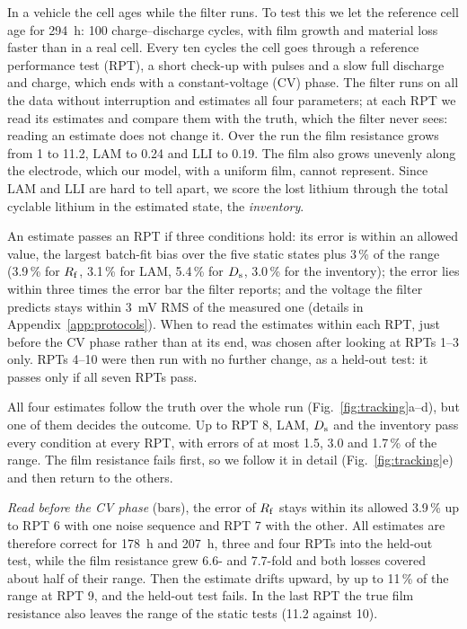 \documentclass[journal]{IEEEtran}
\newcommand{\LAM}{\mathrm{LAM}}\newcommand{\LLI}{\mathrm{LLI}}\newcommand{\phipl}{\phi_{\mathrm{pl}}}
\begin{document}
In a vehicle the cell ages while the filter runs. To test this we let the reference cell age for \SI{294}{\hour}: 100 charge--discharge cycles, with film growth and material loss faster than in a real cell. Every ten cycles the cell goes through a reference performance test (RPT), a short check-up with pulses and a slow full discharge and charge, which ends with a constant-voltage (CV) phase. The filter runs on all the data without interruption and estimates all four parameters; at each RPT we read its estimates and compare them with the truth, which the filter never sees: reading an estimate does not change it. Over the run the film resistance grows from 1 to 11.2, $\LAM$ to 0.24 and $\LLI$ to 0.19. The film also grows unevenly along the electrode, which our model, with a uniform film, cannot represent. Since $\LAM$ and $\LLI$ are hard to tell apart, we score the lost lithium through the total cyclable lithium in the estimated state, the \emph{inventory}.

An estimate passes an RPT if three conditions hold: its error is within an allowed value, the largest batch-fit bias over the five static states plus 3\,\% of the range (3.9\,\% for $R_{\mathrm{f}}$, 3.1\,\% for $\LAM$, 5.4\,\% for $D_{\mathrm{s}}$, 3.0\,\% for the inventory); the error lies within three times the error bar the filter reports; and the voltage the filter predicts stays within \SI{3}{\milli\volt} RMS of the measured one (details in Appendix~\ref{app:protocols}). When to read the estimates within each RPT, just before the CV phase rather than at its end, was chosen after looking at RPTs 1--3 only. RPTs 4--10 were then run with no further change, as a held-out test: it passes only if all seven RPTs pass.

All four estimates follow the truth over the whole run (Fig.~\ref{fig:tracking}a--d), but one of them decides the outcome. Up to RPT 8, $\LAM$, $D_{\mathrm{s}}$ and the inventory pass every condition at every RPT, with errors of at most 1.5, 3.0 and 1.7\,\% of the range. The film resistance fails first, so we follow it in detail (Fig.~\ref{fig:tracking}e) and then return to the others.

\emph{Read before the CV phase} (bars), the error of $R_{\mathrm{f}}$ stays within its allowed 3.9\,\% up to RPT 6 with one noise sequence and RPT 7 with the other. All estimates are therefore correct for \SI{178}{\hour} and \SI{207}{\hour}, three and four RPTs into the held-out test, while the film resistance grew 6.6- and 7.7-fold and both losses covered about half of their range. Then the estimate drifts upward, by up to 11\,\% of the range at RPT 9, and the held-out test fails. In the last RPT the true film resistance also leaves the range of the static tests (11.2 against 10).
\end{document}
